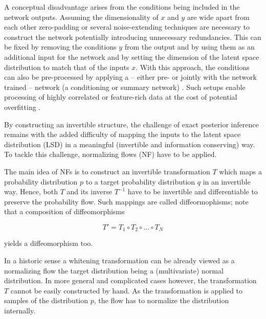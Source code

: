 
A conceptual disadvantage arises from the conditions being included in the network outputs. Assuming the dimensionality of $x$ and $y$ are wide apart from each other zero-padding or several noise-extending techniques are necessary to construct the network potentially introducing unnecessary redundancies. This can be fixed by removing the conditions $y$ from the output and by using them as an additional input for the network and by setting the dimension of the latent space distribution to match that of the inputs $x$. With this approach, the conditions can also be pre-processed by applying a -- either pre- or jointly with the network trained -- network (a conditioning or summary network) \cite{BayesFlow}. Such setups enable processing of highly correlated or feature-rich data at the cost of potential overfitting \cite{Ksoll_2020}. 


By constructing an invertible structure, the challenge of exact posterior inference remains with the added difficulty of mapping the inputs to the latent space distribution (LSD) in a meaningful (invertible and information conserving) way. To tackle this challenge, normalizing flows (NF) have to be applied.


The main idea of NFs is to construct an invertible transformation $T$ which maps a probability distribution $p$ to a target probability distribution $q$ in an invertible way. Hence, both $T$ and its inverse $T^{-1}$ have to be invertible and differentiable to preserve the probability flow. Such mappings are called diffeormophisms; note that a composition of diffeomorphisms

\begin{equation*}
	T' = T_1 \circ T_2 \circ ... \circ T_N
\end{equation*}

yields a diffeomorphism too.

In a historic sense a whitening transformation can be already viewed as a normalizing flow the target distribution being a (multivariate) normal distribution. In more general and complicated cases however, the transformation $T$ cannot be easily constructed by hand. As the transformation is applied to samples of the distribution $p$, the flow has to normalize the distribution internally.

